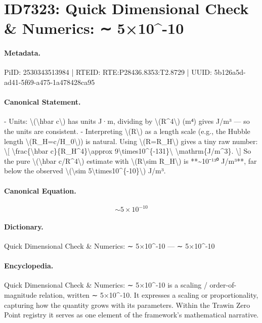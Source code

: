 \section*{ID7323: Quick Dimensional Check \& Numerics: ∼ 5×10\textasciicircum{}-10}
\paragraph{Metadata.}
PiID: 2530343513984 | RTEID: RTE:P28436.8353:T2.8729 | UUID: 5b126a5d-ad41-5f69-a475-1a478428ca95

\paragraph{Canonical Statement.}
- Units: \textbackslash{}(\textbackslash{}hbar c\textbackslash{}) has units J·m, dividing by \textbackslash{}(R\textasciicircum{}4\textbackslash{}) (m⁴) gives J/m³ — so the units are consistent. - Interpreting \textbackslash{}(R\textbackslash{}) as a length scale (e.g., the Hubble length \textbackslash{}(R\_H=c/H\_0\textbackslash{})) is natural. Using \textbackslash{}(R=R\_H\textbackslash{}) gives a tiny raw number: \textbackslash{}[ \textbackslash{}frac\{\textbackslash{}hbar c\}\{R\_H\textasciicircum{}4\}\textbackslash{}approx 9\textbackslash{}times10\textasciicircum{}\{-131\}\textbackslash{} \textbackslash{}mathrm\{J/m\textasciicircum{}3\}. \textbackslash{}] So the pure \textbackslash{}(\textbackslash{}hbar c/R\textasciicircum{}4\textbackslash{}) estimate with \textbackslash{}(R\textbackslash{}sim R\_H\textbackslash{}) is **\textasciitilde{}10⁻¹³⁰ J/m³**, far below the observed \textbackslash{}(\textbackslash{}sim 5\textbackslash{}times10\textasciicircum{}\{-10\}\textbackslash{}) J/m³.

\paragraph{Canonical Equation.}
\[
\sim 5\times10^{-10}
\]

\paragraph{Dictionary.}
Quick Dimensional Check \& Numerics: ∼ 5×10\textasciicircum{}-10 — ∼ 5×10\textasciicircum{}-10

\paragraph{Encyclopedia.}
Quick Dimensional Check \& Numerics: ∼ 5×10\textasciicircum{}-10 is a scaling / order-of-magnitude relation, written ∼ 5×10\textasciicircum{}-10. It expresses a scaling or proportionality, capturing how the quantity grows with its parameters. Within the Trawin Zero Point registry it serves as one element of the framework's mathematical narrative.
